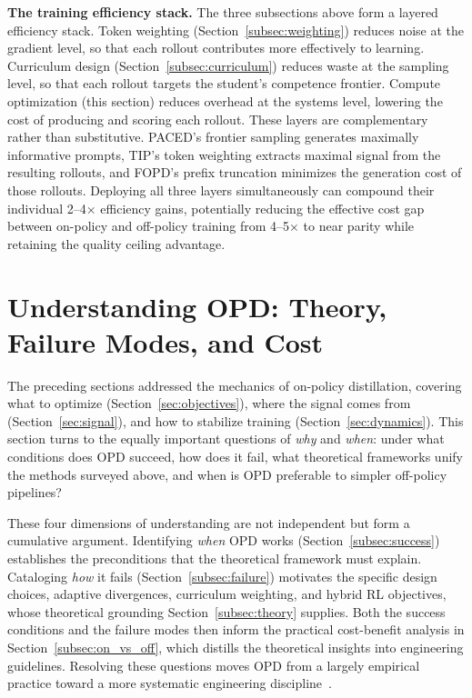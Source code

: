 \documentclass{article} %
\begin{document}
\textbf{The training efficiency stack.} The three subsections above form a layered efficiency stack. Token weighting (Section~\ref{subsec:weighting}) reduces noise at the gradient level, so that each rollout contributes more effectively to learning. Curriculum design (Section~\ref{subsec:curriculum}) reduces waste at the sampling level, so that each rollout targets the student's competence frontier. Compute optimization (this section) reduces overhead at the systems level, lowering the cost of producing and scoring each rollout. These layers are complementary rather than substitutive. PACED's frontier sampling generates maximally informative prompts, TIP's token weighting extracts maximal signal from the resulting rollouts, and FOPD's prefix truncation minimizes the generation cost of those rollouts. Deploying all three layers simultaneously can compound their individual 2--4$\times$ efficiency gains, potentially reducing the effective cost gap between on-policy and off-policy training from 4--5$\times$ to near parity while retaining the quality ceiling advantage.

\section{Understanding OPD: Theory, Failure Modes, and Cost}
\label{sec:understanding}

The preceding sections addressed the mechanics of on-policy distillation, covering what to optimize (Section~\ref{sec:objectives}), where the signal comes from (Section~\ref{sec:signal}), and how to stabilize training (Section~\ref{sec:dynamics}). This section turns to the equally important questions of \emph{why} and \emph{when}: under what conditions does OPD succeed, how does it fail, what theoretical frameworks unify the methods surveyed above, and when is OPD preferable to simpler off-policy pipelines?

These four dimensions of understanding are not independent but form a cumulative argument. Identifying \emph{when} OPD works (Section~\ref{subsec:success}) establishes the preconditions that the theoretical framework must explain. Cataloging \emph{how} it fails (Section~\ref{subsec:failure}) motivates the specific design choices, adaptive divergences, curriculum weighting, and hybrid RL objectives, whose theoretical grounding Section~\ref{subsec:theory} supplies. Both the success conditions and the failure modes then inform the practical cost-benefit analysis in Section~\ref{subsec:on_vs_off}, which distills the theoretical insights into engineering guidelines. Resolving these questions moves OPD from a largely empirical practice toward a more systematic engineering discipline~\citep{2602.12222,2604.13016}.
\end{document}

